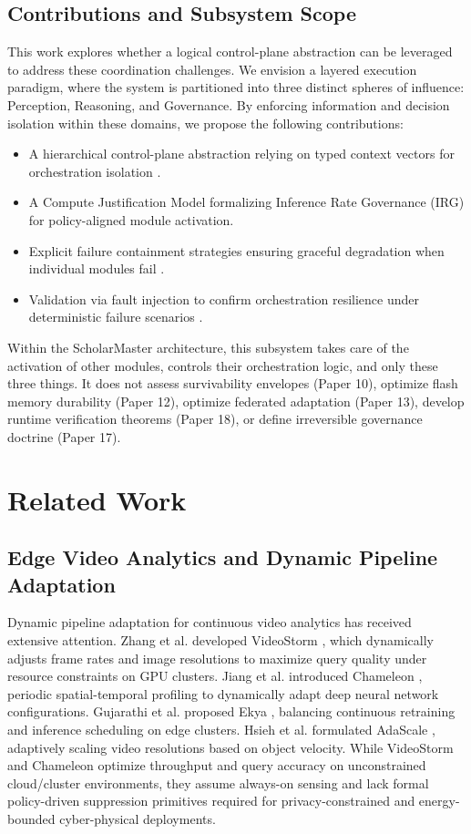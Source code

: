 \documentclass[conference]{IEEEtran}
\begin{document}
\subsection{Contributions and Subsystem Scope}
This work explores whether a logical control-plane abstraction can be leveraged to address these coordination challenges. We envision a layered execution paradigm, where the system is partitioned into three distinct spheres of influence: Perception, Reasoning, and Governance. By enforcing information and decision isolation within these domains, we propose the following contributions:
\begin{itemize}
    \item A hierarchical control-plane abstraction relying on typed context vectors for orchestration isolation \cite{b17}.
    \item A Compute Justification Model formalizing Inference Rate Governance (IRG) for policy-aligned module activation.
    \item Explicit failure containment strategies ensuring graceful degradation when individual modules fail \cite{b18}.
    \item Validation via fault injection to confirm orchestration resilience under deterministic failure scenarios \cite{b28}.
\end{itemize}

Within the ScholarMaster architecture, this subsystem takes care of the activation of other modules, controls their orchestration logic, and only these three things. It does not assess survivability envelopes (Paper 10), optimize flash memory durability (Paper 12), optimize federated adaptation (Paper 13), develop runtime verification theorems (Paper 18), or define irreversible governance doctrine (Paper 17).

\section{Related Work}

\subsection{Edge Video Analytics and Dynamic Pipeline Adaptation}
Dynamic pipeline adaptation for continuous video analytics has received extensive attention. Zhang et al. developed VideoStorm \cite{b33}, which dynamically adjusts frame rates and image resolutions to maximize query quality under resource constraints on GPU clusters. Jiang et al. introduced Chameleon \cite{b34}, periodic spatial-temporal profiling to dynamically adapt deep neural network configurations. Gujarathi et al. proposed Ekya \cite{b35}, balancing continuous retraining and inference scheduling on edge clusters. Hsieh et al. formulated AdaScale \cite{b36}, adaptively scaling video resolutions based on object velocity. While VideoStorm and Chameleon optimize throughput and query accuracy on unconstrained cloud/cluster environments, they assume always-on sensing and lack formal policy-driven suppression primitives required for privacy-constrained and energy-bounded cyber-physical deployments.
\end{document}
